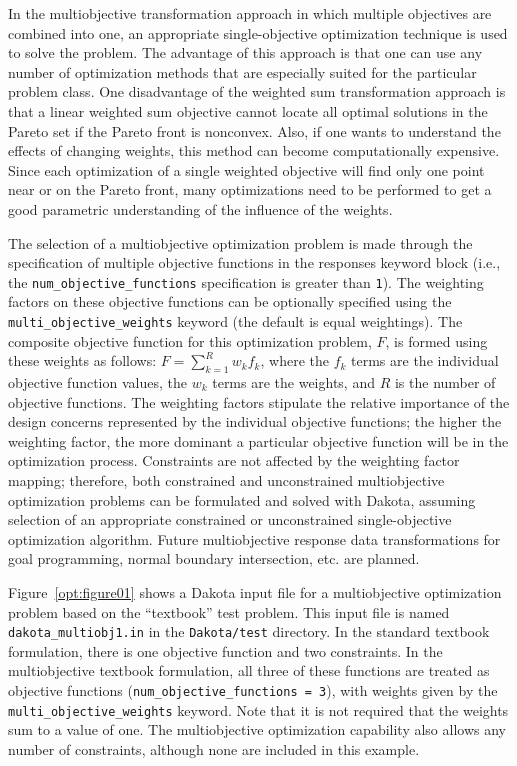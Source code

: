 In the multiobjective transformation approach in which multiple
objectives are combined into one, an appropriate single-objective
optimization technique is used to solve the problem.  The advantage of
this approach is that one can use any number of optimization methods
that are especially suited for the particular problem class. One
disadvantage of the weighted sum transformation approach is that a
linear weighted sum objective cannot locate all optimal solutions in
the Pareto set if the Pareto front is nonconvex.  Also, if one wants
to understand the effects of changing weights, this method can become
computationally expensive.  Since each optimization of a single
weighted objective will find only one point near or on the Pareto
front, many optimizations need to be performed to get a good
parametric understanding of the influence of the weights.

The selection of a multiobjective optimization problem is made through
the specification of multiple objective functions in the responses
keyword block (i.e., the \texttt{num\_objective\_functions}
specification is greater than \texttt{1}). The weighting factors on
these objective functions can be optionally specified using the
\texttt{multi\_objective\_weights} keyword (the default is equal
weightings). The composite objective function for this optimization
problem, $F$, is formed using these weights as follows:
$F=\sum_{k=1}^{R}w_{k}f_{k}$, where the $f_{k}$ terms are the
individual objective function values, the $w_{k}$ terms are the
weights, and $R$ is the number of objective functions. The weighting
factors stipulate the relative importance of the design concerns
represented by the individual objective functions; the higher the
weighting factor, the more dominant a particular objective function
will be in the optimization process.  Constraints are not affected by
the weighting factor mapping; therefore, both constrained and
unconstrained multiobjective optimization problems can be formulated
and solved with Dakota, assuming selection of an appropriate
constrained or unconstrained single-objective optimization algorithm.
Future multiobjective response data transformations for goal
programming, normal boundary intersection, etc. are planned.

Figure~\ref{opt:figure01} shows a Dakota input file for a
multiobjective optimization problem based on the ``textbook'' test
problem. This input file is named \texttt{dakota\_multiobj1.in} in the
\texttt{Dakota/test} directory. In the standard textbook formulation,
there is one objective function and two constraints. In the
multiobjective textbook formulation, all three of these functions are
treated as objective functions (\texttt{num\_objective\_functions =
  3}), with weights given by the \texttt{multi\_objective\_weights}
keyword.  Note that it is not required that the weights sum to a value
of one.  The multiobjective optimization capability also allows any
number of constraints, although none are included in this example.

